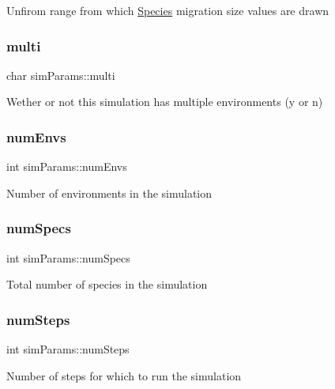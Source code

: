 Unfirom range from which \hyperlink{classSpecies}{Species} migration size values are drawn \hypertarget{structsimParams_a2c0a57da585258a84362a2c297ee44cb}{}\label{structsimParams_a2c0a57da585258a84362a2c297ee44cb} 
\subsubsection{\texorpdfstring{multi}{multi}}
{\footnotesize\ttfamily char sim\+Params\+::multi}

Wether or not this simulation has multiple environments (\textquotesingle{}y\textquotesingle{} or \textquotesingle{}n\textquotesingle{}) \hypertarget{structsimParams_a5d284deecb9cbd1b2680670822cae29a}{}\label{structsimParams_a5d284deecb9cbd1b2680670822cae29a} 
\subsubsection{\texorpdfstring{num\+Envs}{numEnvs}}
{\footnotesize\ttfamily int sim\+Params\+::num\+Envs}

Number of environments in the simulation \hypertarget{structsimParams_a83b3c9f8e5dee0b7b4e63a17dc2646bd}{}\label{structsimParams_a83b3c9f8e5dee0b7b4e63a17dc2646bd} 
\subsubsection{\texorpdfstring{num\+Specs}{numSpecs}}
{\footnotesize\ttfamily int sim\+Params\+::num\+Specs}

Total number of species in the simulation \hypertarget{structsimParams_a027234312109ab21e3f8dacda4039c9f}{}\label{structsimParams_a027234312109ab21e3f8dacda4039c9f} 
\subsubsection{\texorpdfstring{num\+Steps}{numSteps}}
{\footnotesize\ttfamily int sim\+Params\+::num\+Steps}

Number of steps for which to run the simulation \hypertarget{structsimParams_a2822e99362ed71f123e812a8fd9ad443}{}\label{structsimParams_a2822e99362ed71f123e812a8fd9ad443} 
